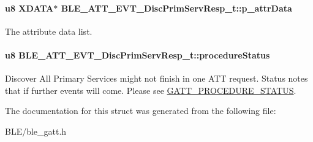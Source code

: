 \paragraph[{\texorpdfstring{p\+\_\+attr\+Data}{p_attrData}}]{\setlength{\rightskip}{0pt plus 5cm}u8 X\+D\+A\+TA$\ast$ B\+L\+E\+\_\+\+A\+T\+T\+\_\+\+E\+V\+T\+\_\+\+Disc\+Prim\+Serv\+Resp\+\_\+t\+::p\+\_\+attr\+Data}\hypertarget{struct_b_l_e___a_t_t___e_v_t___disc_prim_serv_resp__t_aa8dada4dc9e6f30180f2bd19fff41e42}{}\label{struct_b_l_e___a_t_t___e_v_t___disc_prim_serv_resp__t_aa8dada4dc9e6f30180f2bd19fff41e42}
The attribute data list. 
\paragraph[{\texorpdfstring{procedure\+Status}{procedureStatus}}]{\setlength{\rightskip}{0pt plus 5cm}u8 B\+L\+E\+\_\+\+A\+T\+T\+\_\+\+E\+V\+T\+\_\+\+Disc\+Prim\+Serv\+Resp\+\_\+t\+::procedure\+Status}\hypertarget{struct_b_l_e___a_t_t___e_v_t___disc_prim_serv_resp__t_ac725e386fdceac6c124b7f8db64369cd}{}\label{struct_b_l_e___a_t_t___e_v_t___disc_prim_serv_resp__t_ac725e386fdceac6c124b7f8db64369cd}
Discover All Primary Services might not finish in one A\+TT request. Status notes that if further events will come. Please see \hyperlink{group___g_a_t_t___p_r_o_c_e_d_u_r_e___s_t_a_t_u_s}{G\+A\+T\+T\+\_\+\+P\+R\+O\+C\+E\+D\+U\+R\+E\+\_\+\+S\+T\+A\+T\+US}. 

The documentation for this struct was generated from the following file\+:\begin{DoxyCompactItemize}
\item 
B\+L\+E/ble\+\_\+gatt.\+h\end{DoxyCompactItemize}
